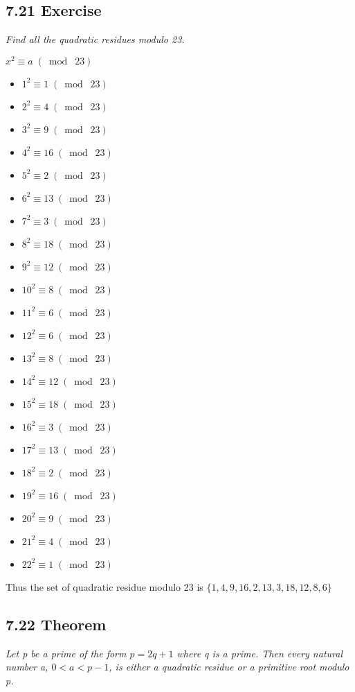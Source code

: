 \documentclass{article}
\begin{document}
\subsection*{7.21 Exercise} 
\quad \textit{Find all the quadratic residues modulo 23.}
\begin{center}
    $x^2  \equiv a \;(\bmod\; 23)$
\end{center}
\begin{itemize}
    \item $1^2 \equiv 1 \;(\bmod\; 23)$
    \item $2^2 \equiv 4 \;(\bmod\; 23)$
    \item $3^2 \equiv 9 \;(\bmod\; 23)$
    \item $4^2 \equiv 16 \;(\bmod\; 23)$
    \item $5^2 \equiv 2 \;(\bmod\; 23)$
    \item $6^2 \equiv 13 \;(\bmod\; 23)$
    \item $7^2 \equiv 3 \;(\bmod\; 23)$
    \item $8^2 \equiv 18 \;(\bmod\; 23)$
    \item $9^2 \equiv 12 \;(\bmod\; 23)$
    \item $10^2 \equiv 8 \;(\bmod\; 23)$
    \item $11^2 \equiv 6 \;(\bmod\; 23)$
    \item $12^2 \equiv 6 \;(\bmod\; 23)$
    \item $13^2 \equiv 8 \;(\bmod\; 23)$
    \item $14^2 \equiv 12 \;(\bmod\; 23)$
    \item $15^2 \equiv 18 \;(\bmod\; 23)$
    \item $16^2 \equiv 3 \;(\bmod\; 23)$
    \item $17^2 \equiv 13 \;(\bmod\; 23)$
    \item $18^2 \equiv 2 \;(\bmod\; 23)$
    \item $19^2 \equiv 16 \;(\bmod\; 23)$
    \item $20^2 \equiv 9 \;(\bmod\; 23)$
    \item $21^2 \equiv 4 \;(\bmod\; 23)$
    \item $22^2 \equiv 1 \;(\bmod\; 23)$
\end{itemize}
Thus the set of quadratic residue modulo 23 is $\{1,4,9,16,2,13,3,18,12,8,6\}$

\subsection*{7.22 Theorem} 
\quad \textit{Let p be a prime of the form $p=2q+1$ where q is a prime. Then every natural number a, $0<a<p-1$, is either a quadratic residue or a primitive root modulo p.}
\end{document}
